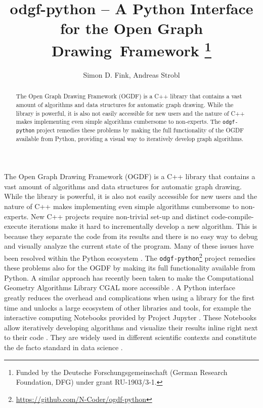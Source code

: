 \documentclass{llncs}
\title{odgf-python -- A Python Interface for the Open Graph Drawing~Framework%
  \thanks{Funded by the Deutsche Forschungsgemeinschaft (German Research Foundation, DFG) under grant RU-1903/3-1.}
}
\author{Simon D. Fink, Andreas Strobl}
\institute{University of Passau, Faculty for Mathematics and Computer Science, Germany\\\email{\{finksim,strobland\}@fim.uni-passau.de}}
\date{}
\begin{document}
\maketitle

\begin{abstract}
The Open Graph Drawing Framework (OGDF) is a C++ library that contains a vast amount of algorithms and data structures for automatic graph drawing.
While the library is powerful, it is also not easily accessible for new users and the nature of C++ makes implementing even simple algorithms cumbersome to non-experts.
The \texttt{odgf-python} project remedies these problems by making the full functionality of the OGDF available from Python, providing a visual way to iteratively develop graph algorithms.

\end{abstract}


The Open Graph Drawing Framework (OGDF) \cite{cgj-tog-13} is a C++ library that contains a vast amount of algorithms and data structures for
automatic graph drawing.
While the library is powerful, it is also not easily accessible for new users and the nature of C++ makes implementing even simple algorithms cumbersome to non-experts.
New C++ projects require non-trivial set-up and distinct code-compile-execute iterations make it hard to incrementally develop a new algorithm.
This is because they separate the code from its results and there is no easy way to debug and visually analyze the current state of the program.
Many of these issues have been resolved within the Python ecosystem \cite{per-tcc-21}.
The \texttt{odgf-python}\footnote{\url{https://github.com/N-Coder/ogdf-python}} project remedies these problems also for the OGDF by making its full functionality available from Python.
A similar approach has recently been taken to make the Computational Geometry Algorithms Library CGAL more accessible \cite{gfh-cmm-22}.
A Python interface greatly reduces the overhead and complications when using a library for the first time and unlocks a large ecosystem
of other libraries and tools, for example the interactive computing Notebooks provided by Project Jupyter \cite{krp-jn-16}.
These Notebooks allow iteratively developing algorithms and visualize their results inline right next to their code \cite{per-tcc-21}.
They are widely used in different scientific contexts and constitute the de facto standard in data science \cite{per-wji-18}.
\end{document}
